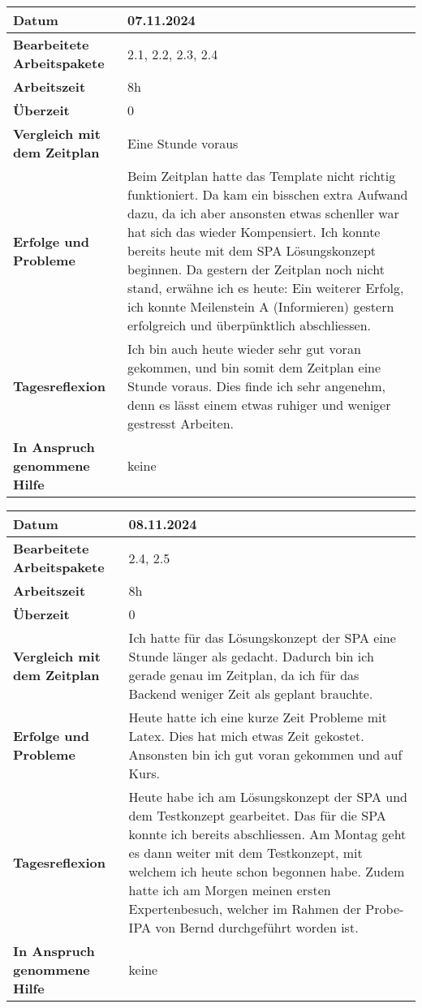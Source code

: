 \begin{longtable}{p{}|p{}}
	\hline
	\textbf{Datum}                       & 07.11.2024 \\
	\hline
	\textbf{Bearbeitete Arbeitspakete}   & 2.1, 2.2, 2.3, 2.4 \\
	\hline
	\textbf{Arbeitszeit}                 & 8h \\
	\hline
	\textbf{Überzeit}                    & 0 \\
	\hline
	\textbf{Vergleich mit dem Zeitplan}  & Eine Stunde voraus \\
	\hline
	\textbf{Erfolge und Probleme}        & Beim Zeitplan hatte das Template nicht richtig funktioniert. Da kam ein bisschen extra Aufwand dazu, da ich aber ansonsten etwas schenller war hat sich das wieder Kompensiert. Ich konnte bereits heute mit dem SPA Lösungskonzept beginnen. Da gestern der Zeitplan noch nicht stand, erwähne ich es heute: Ein weiterer Erfolg, ich konnte
Meilenstein A (Informieren)	gestern erfolgreich und überpünktlich abschliessen.\\
	\hline
	\textbf{Tagesreflexion}              & Ich bin auch heute wieder sehr gut voran gekommen, und bin somit dem Zeitplan eine Stunde voraus. Dies finde ich sehr angenehm, denn es lässt einem etwas ruhiger und weniger gestresst Arbeiten.\\
	\hline
	\textbf{In Anspruch genommene Hilfe} & keine\\
	\hline
\end{longtable}\label{tab:arbeitsprotokoll-tag2}

\newpage

\begin{longtable}{p{}|p{}}
	\hline
	\textbf{Datum}                       & 08.11.2024 \\
	\hline
	\textbf{Bearbeitete Arbeitspakete}   & 2.4, 2.5 \\
	\hline
	\textbf{Arbeitszeit}                 & 8h \\
	\hline
	\textbf{Überzeit}                    & 0 \\
	\hline
	\textbf{Vergleich mit dem Zeitplan}  & Ich hatte für das Lösungskonzept der SPA eine Stunde länger als gedacht. Dadurch bin ich gerade genau im Zeitplan, da ich für das Backend weniger Zeit als geplant brauchte. \\
	\hline
	\textbf{Erfolge und Probleme}        & Heute hatte ich eine kurze Zeit Probleme mit Latex. Dies hat mich etwas Zeit gekostet. Ansonsten bin ich gut voran gekommen und auf Kurs.
	\\
	\hline
	\textbf{Tagesreflexion}              & Heute habe ich am Lösungskonzept der SPA und dem Testkonzept gearbeitet. Das für die SPA konnte ich bereits abschliessen. Am Montag geht es dann weiter mit dem Testkonzept, mit welchem ich heute schon begonnen habe. Zudem hatte ich am Morgen meinen ersten Expertenbesuch, welcher im Rahmen der Probe-IPA von Bernd durchgeführt worden ist.
	\\
	\hline
	\textbf{In Anspruch genommene Hilfe} & keine \\
	\hline
\end{longtable}\label{tab:arbeitsprotokoll-tag3}
\newpage

